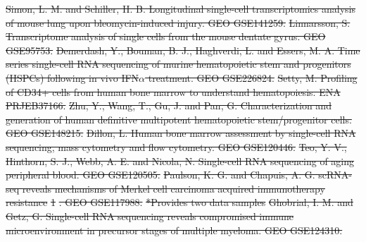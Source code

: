 \documentclass[referee, pdflatex, sn-vancouver-num]{sn-jnl}
\providecommand{\DIFdeltex}[1]{{\protect\color{red}\sout{#1}}}                      %
\providecommand{\DIFdel}[1]{\texorpdfstring{\DIFdeltex{#1}}{}} %
\begin{document}
\begin{appendices}
\DIFdel{Simon, L. M. and Schiller, H. B. Longitudinal single-cell transcriptomics analysis of mouse lung upon bleomycin-induced injury. GEO GSE141259. }%
\DIFdel{Linnarsson, S.
Transcriptome analysis of single cells from the mouse dentate gyrus. GEO GSE95753. }%
\DIFdel{Demerdash, Y., Bouman, B. J., Haghverdi, L. and Essers, M. A. Time series single-cell RNA sequencing of murine hematopoietic stem and progenitors (HSPCs) following in vivo IFN$\alpha$ treatment. GEO GSE226824. }%
\DIFdel{Setty, M. Profiling of CD34+ cells from human bone marrow to understand hematopoiesis. ENA PRJEB37166. }%
\DIFdel{Zhu, Y., Wang, T., Gu, J. and Pan, G. Characterization and generation of human definitive multipotent hematopoietic stem/progenitor cells. GEO GSE148215. }%
\DIFdel{Dillon, L. Human bone marrow assessment by single-cell RNA sequencing, mass cytometry and flow cytometry. GEO GSE120446. }%
\DIFdel{Teo, Y. V., Hinthorn, S. J., Webb, A. E. and Nicola, N. Single-cell RNA sequencing of aging peripheral blood. GEO GSE120505. }%
\DIFdel{Paulson, K. G. and Chapuis, A. G. scRNA-seq reveals mechanisms of Merkel cell carcinoma acquired immunotherapy resistance }%
\DIFdel{1}%
\DIFdel{. GEO GSE117988. }%
\DIFdel{*Provides two data samples
	}%
\DIFdel{Ghobrial, I. M. and Getz, G. Single-cell RNA sequencing reveals compromised immune microenvironment in precursor stages of multiple myeloma. GEO GSE124310. }%

\end{appendices}
\end{document}
